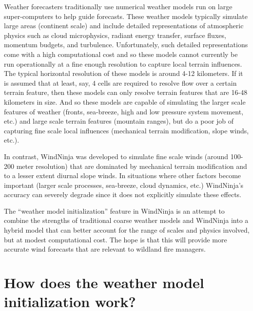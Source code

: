 \documentclass[12pt]{article}
\begin{document}
Weather forecasters traditionally use numerical weather models run on large super-computers to help guide forecasts.  These weather models typically simulate large areas (continent scale) and include detailed representations of atmospheric physics such as cloud microphysics, radiant energy transfer, surface fluxes, momentum budgets, and turbulence.  Unfortunately, such detailed representations come with a high computational cost and so these models cannot currently be run operationally at a fine enough resolution to capture local terrain influences.  The typical horizontal resolution of these models is around 4-12 kilometers.  If it is assumed that at least, say, 4 cells are required to resolve flow over a certain terrain feature, then these models can only resolve terrain features that are 16-48 kilometers in size.  And so these models are capable of simulating the larger scale features of weather (fronts, sea-breeze, high and low pressure system movement, etc.) and large scale terrain features (mountain ranges), but do a poor job of capturing fine scale local influences (mechanical terrain modification, slope winds, etc.).

In contrast, WindNinja was developed to simulate fine scale winds (around 100-200 meter resolution) that are dominated by mechanical terrain modification and to a lesser extent diurnal slope winds.  In situations where other factors become important (larger scale processes, sea-breeze, cloud dynamics, etc.) WindNinja's accuracy can severely degrade since it does not explicitly simulate these effects.

The “weather model initialization” feature in WindNinja is an attempt to combine the strengths of traditional coarse weather models and WindNinja into a hybrid model that can better account for the range of scales and physics involved, but at modest computational cost.  The hope is that this will provide more accurate wind forecasts that are relevant to wildland fire managers.

\section*{How does the weather model initialization work?}
\end{document}
